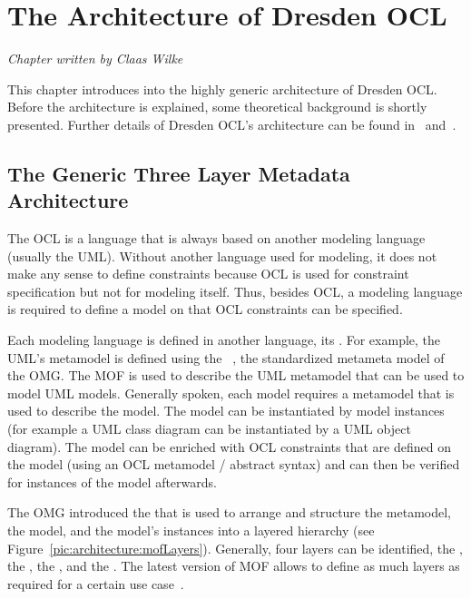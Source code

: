 \chapter{The Architecture of Dresden OCL}
\label{chapter:architecture}

\begin{flushright}
\textit{Chapter written by Claas Wilke}
\end{flushright}

This chapter introduces into the highly generic architecture of Dresden OCL.
Before the architecture is explained, some theoretical background is shortly 
presented. Further details of Dresden OCL's architecture can be found
in~\cite{braeuerEA:OCL2007} and~\cite{wilkeEA:MODELS2010}.



\section{The Generic Three Layer Metadata Architecture}
\label{architecture:genericLayers}

The \acl{OCL} is a language that is always based on another modeling language 
(usually the \acs{UML}). Without another language used for modeling, it does 
not make any sense to define constraints because \acs{OCL} is used for
constraint specification but not for modeling itself. Thus, besides \acs{OCL}, 
a modeling language is required to define a model on that \acs{OCL} constraints 
can be specified.

Each modeling language is defined in another language, its 
. For example, the \acl{UML}'s metamodel is 
defined using the ~\cite{spec:MOF2.0}, the standardized
metameta model of the \acs{OMG}. The \acs{MOF} is used to describe the 
\acs{UML} metamodel that can be used to model \acs{UML} models. Generally 
spoken, each model requires a metamodel that is used to describe the model. 
The model can be instantiated by model instances (for example a \acs{UML} class 
diagram can be instantiated by a \acs{UML} object diagram). The model can be 
enriched with \acs{OCL} constraints that are defined on the model (using an 
\acs{OCL} metamodel / abstract syntax) and can then be verified for instances
of the model afterwards.

The \acs{OMG} introduced the  \cite{spec:MOF2.0}\cite[p. 16ff]{spec:UML2-2Inf} that is used to 
arrange and structure the metamodel, the model, and the model's instances into 
a layered hierarchy (see Figure~\ref{pic:architecture:mofLayers}). Generally, 
four layers can be identified, the , the
, the , and the 
. The latest version of \acs{MOF} allows to
define as much layers as required for a certain use
case~\cite[p.~8f]{spec:MOF2.0}. 

